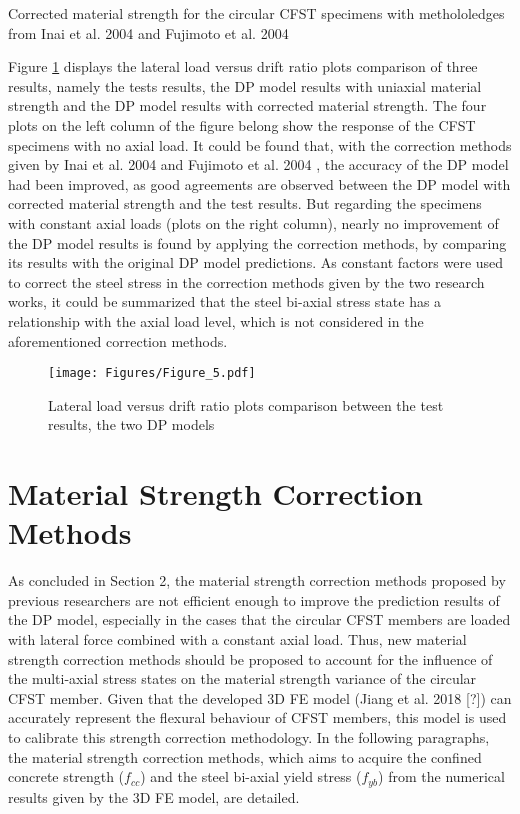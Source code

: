 \documentclass[12pt,a4]{article}
\begin{document}
	\par
	\begin{table}[h]
		\centering
		\caption{Corrected material strength for the circular CFST specimens with methololedges from Inai et al. 2004 \cite{RN30} and Fujimoto et al. 2004 \cite{RN15}}
		
		\label{tb-1}
	\end{table}
	\par
	Figure \ref{fig-4} displays the lateral load versus drift ratio plots comparison of three results, namely the tests results, the DP model results with uniaxial material strength and the DP model results with corrected material strength. The four plots on the left column of the figure belong show the response of the CFST specimens with no axial load. It could be found that, with the correction methods given by Inai et al. 2004 \cite{RN30} and Fujimoto et al. 2004 \cite{RN15}, the accuracy of the DP model had been improved, as good agreements are observed between the DP model with corrected material strength and the test results. But regarding the specimens with constant axial loads (plots on the right column), nearly no improvement of the DP model results is found by applying the correction methods, by comparing its results with the original DP model predictions. As constant factors were used to correct the steel stress in the correction methods given by the two research works, it could be summarized that the steel bi-axial stress state has a relationship with the axial load level, which is not considered in the aforementioned correction methods.
	\par
	\begin{figure}[h]
		\centering
		\texttt{[image: Figures/Figure\_5.pdf]}
		\caption{Lateral load versus drift ratio plots comparison between the test results, the two DP models}
		\label{fig-4}
	\end{figure}
	\par
	\section{Material Strength Correction Methods}
	As concluded in Section 2, the material strength correction methods proposed by previous researchers are not efficient enough to improve the prediction results of the DP model, especially in the cases that the circular CFST members are loaded with lateral force combined with a constant axial load. Thus, new material strength correction methods should be proposed to account for the influence of the multi-axial stress states on the material strength variance of the circular CFST member. Given that the developed 3D FE model (Jiang et al. 2018 [?]) can accurately represent the flexural behaviour of CFST members, this model is used to calibrate this strength correction methodology. In the following paragraphs, the material strength correction methods, which aims to acquire the confined concrete strength ($f_{cc}$) and the steel bi-axial yield stress ($f_{yb}$) from the numerical results given by the 3D FE model, are detailed.
	\par
	
\end{document}
